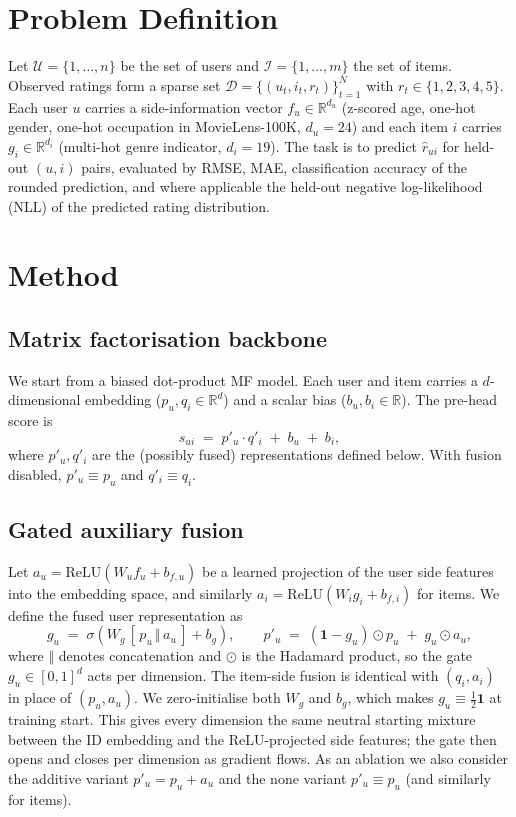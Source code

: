 \documentclass[a4paper]{article} %
\begin{document}
\section{Problem Definition}
\label{sec:problem}

Let $\mathcal{U}=\{1,\dots,n\}$ be the set of users and $\mathcal{I}=\{1,\dots,m\}$
the set of items. Observed ratings form a sparse set
$\mathcal{D}=\{(u_t,i_t,r_t)\}_{t=1}^{N}$ with $r_t\in\{1,2,3,4,5\}$. Each user
$u$ carries a side-information vector $f_u\in\mathbb{R}^{d_u}$ (z-scored age,
one-hot gender, one-hot occupation in MovieLens-100K, $d_u=24$) and each
item $i$ carries $g_i\in\mathbb{R}^{d_i}$ (multi-hot genre indicator,
$d_i=19$). The task
is to predict $\hat r_{ui}$ for held-out $(u,i)$ pairs, evaluated by RMSE, MAE,
classification accuracy of the rounded prediction, and where applicable the
held-out negative log-likelihood (NLL) of the predicted rating distribution.

\section{Method}
\label{sec:method}

\subsection{Matrix factorisation backbone}
We start from a biased dot-product MF model. Each user and item carries a
$d$-dimensional embedding ($p_u, q_i\in\mathbb{R}^d$) and a scalar bias
($b_u, b_i\in\mathbb{R}$). The pre-head score is
\begin{equation}
\label{eq:score}
s_{ui} \;=\; p'_u \cdot q'_i \;+\; b_u \;+\; b_i,
\end{equation}
where $p'_u,q'_i$ are the (possibly fused) representations defined below. With
fusion disabled, $p'_u\equiv p_u$ and $q'_i\equiv q_i$.

\subsection{Gated auxiliary fusion}
\label{sec:method:fusion}
Let $a_u=\mathrm{ReLU}(W_u f_u + b_{f,u})$ be a learned projection of the user
side features into the embedding space, and similarly $a_i=\mathrm{ReLU}(W_i g_i + b_{f,i})$
for items. We define the fused user representation as
\begin{equation}
\label{eq:gate}
g_u \;=\; \sigma\!\left(W_g \,[\,p_u \,\Vert\, a_u\,] + b_g\right),\qquad
p'_u \;=\; (\mathbf{1}-g_u)\odot p_u \;+\; g_u\odot a_u,
\end{equation}
where $\Vert$ denotes concatenation and $\odot$ is the Hadamard product, so the
gate $g_u\in[0,1]^d$ acts per dimension. The item-side fusion is
identical with $(q_i,a_i)$ in place of $(p_u,a_u)$. We zero-initialise both
$W_g$ and $b_g$, which makes $g_u\equiv \tfrac12\mathbf{1}$ at training start.
This gives every dimension the same neutral starting mixture between the ID
embedding and the ReLU-projected side features; the gate then opens and closes
per dimension as gradient flows. As an ablation we also consider the
additive variant $p'_u = p_u + a_u$ and the none variant
$p'_u\equiv p_u$ (and similarly for items).
\end{document}
